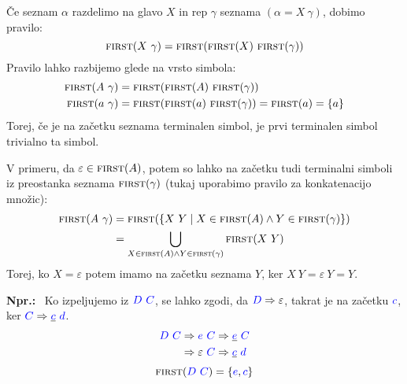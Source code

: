 \documentclass{article}
\newcommand{\Ex}{\textbf{Npr.:}\ }
\newcommand{\FIRST}{\textsc{first}}
\newcommand{\Symbol}[1]{\textcolor{blue}{#1}}
\newcommand{\Null}{\varepsilon}
\newcommand{\Derive}{\Rightarrow}
\newcommand{\Seq}{\ }
\begin{document}
Če seznam $\alpha$ razdelimo na glavo $X$ in rep $\gamma$ seznama ${(\alpha = X \Seq \gamma)}$, dobimo pravilo:
\begin{equation*}
  \FIRST(X \Seq \gamma) = \FIRST(\FIRST(X) \Seq \FIRST(\gamma))
\end{equation*}
Pravilo lahko razbijemo glede na vrsto simbola:
\begin{align*}
  \FIRST(A \Seq \gamma) &= \FIRST(\FIRST(A) \Seq \FIRST(\gamma))\\
  \FIRST(a \Seq \gamma) &= \FIRST(\FIRST(a) \Seq \FIRST(\gamma)) = \FIRST(a) = \{a\}
\end{align*}
Torej, če je na začetku seznama terminalen simbol, je prvi terminalen simbol trivialno ta simbol.

V primeru, da $\varepsilon \in \FIRST(A)$, potem so lahko na začetku tudi terminalni simboli iz preostanka seznama $\FIRST(\gamma)$ (tukaj uporabimo pravilo za konkatenacijo množic):
\begin{align*}
  \FIRST(A \Seq \gamma) &= \FIRST(\{X \Seq Y \mid X \in \FIRST(A) \land Y \in \FIRST(\gamma)\})\\
   &= \bigcup_{X \in \FIRST(A) \land Y \in \FIRST(\gamma)} \FIRST(X \Seq Y)
\end{align*}
Torej, ko $X = \Null$ potem imamo na začetku seznama $Y$, ker $X \Seq Y = \Null \Seq Y = Y$.

\Ex
  Ko izpeljujemo iz $\Symbol{D} \Seq \Symbol{C}$, se lahko zgodi, da $\Symbol{D} \Derive \Null$, takrat je na začetku $\Symbol{c}$, ker $\Symbol{C} \Derive \underline{\Symbol{c}} \Seq \Symbol{d}$. 
  \begin{equation*}
    \Symbol{D} \Seq \Symbol{C} \begin{aligned}[t]
      &\Derive \Symbol{e} \Seq \Symbol{C} \Derive \underline{\Symbol{e}} \Seq \Symbol{C} \\
      &\Derive \Null \Seq \Symbol{C} \Derive \underline{\Symbol{c}} \Seq \Symbol{d} \\
    \end{aligned}
  \end{equation*}
  \begin{equation*}
    \FIRST(\Symbol{D} \Seq \Symbol{C}) = \{\Symbol{e}, \Symbol{c}\}
  \end{equation*}
\end{document}
